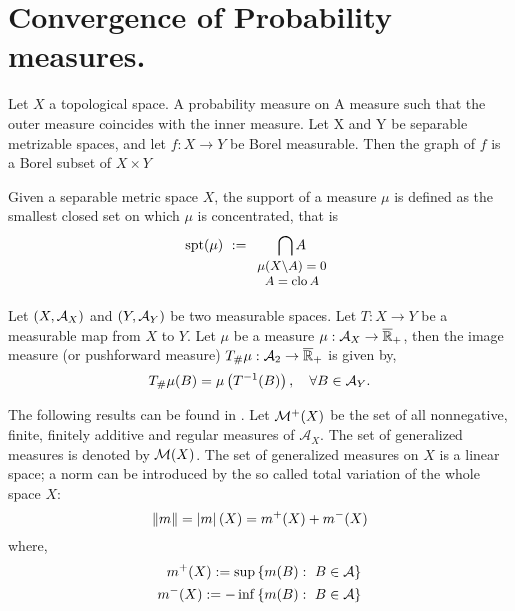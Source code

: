 \section{Convergence of Probability measures.}

Let $X$ a topological space. 
A probability measure on 
A measure such that the outer measure coincides with the inner measure.
Let X and Y be separable metrizable spaces, and let $f: X \to Y$ be Borel measurable. Then the graph of $f$ is a Borel subset of $X\times Y$
\begin{definition}
	Given a separable metric space $X$, the support of a measure $\mu$ is defined as the smallest closed set on which $\mu$ is concentrated, that is
	\begin{equation}
	\spt(\mu)\ :=\underset{\small{\begin{array}{c}
			\mu(X\backslash A)=0\\ A=\closu A  \end{array}}}{\bigcap A} 		
	\end{equation} 
\end{definition}
\begin{definition}
	Let $\left( X, \mathcal{A}_X \right)$  and $\left( Y, \mathcal{A}_Y \right)$ be two measurable spaces. Let $T:X\rightarrow Y$ be a measurable map from $X$ to $Y$. Let $\mu$ be a measure $\mu: \mathcal{A}_X\rightarrow \overline{\mathbb{R}}_+$, then the image measure (or pushforward measure) ${T}_{\#} \mu:\mathcal{A}_2\rightarrow \overline{\mathbb{R}}_+$ is given by,
	\begin{equation*}
	{T}_{\#} \mu(B) = \mu\left( T^{-1}(B) \right), \quad \forall B \in \mathcal{A}_Y.
	\end{equation*}
\end{definition}

The following results can be found in \cite{Milan2000TpicsWeakconvProbs}.
Let $\mathcal{M}^+(X)$ be the set of all nonnegative, finite, finitely additive and regular measures of $\mathcal{A}_X$. The set of generalized measures is denoted by $\mathcal{M}(X)$. The set of generalized measures on $X$ is a linear space; a norm can be introduced by the so called total variation of the whole space $X$:
\begin{equation}
	\left\|m\right\|=\left| m \right|(X)=m^+(X)+m^-(X)
\end{equation}
where, 
\begin{align*}
	m^+(X):=\sup\left\lbrace m(B):\ B \in \mathcal{A} \right\rbrace \\
	m^-(X):=-\inf\left\lbrace m(B):\ B \in \mathcal{A} \right\rbrace
\end{align*}

